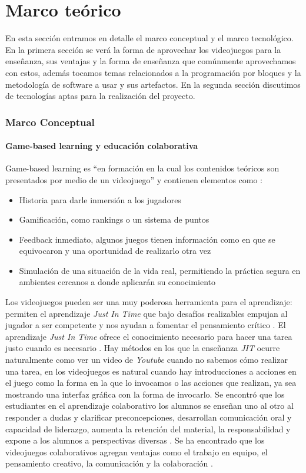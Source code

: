 \chapter{Marco teórico}
En esta sección entramos en detalle el marco conceptual y el marco tecnológico. En la primera sección se verá la forma de aprovechar los videojuegos para la enseñanza, sus ventajas y la forma de enseñanza que comúnmente aprovechamos con estos, además tocamos temas relacionados a la programación por bloques y la metodología de software a usar y sus artefactos. En la segunda sección discutimos de tecnologías aptas para la realización del proyecto.

\subsection{Marco Conceptual}
\subsubsection{Game-based learning y educación colaborativa}
Game-based learning es “en formación en la cual los contenidos teóricos son presentados por medio de un videojuego” \cite{gamelearn2014a} y contienen elementos como \cite{gamelearn2017a}:
\begin{itemize}
    \item Historia para darle inmersión a los jugadores
    \item Gamificación, como rankings o un sistema de puntos
    \item Feedback inmediato, algunos juegos tienen información como en que se equivocaron y una oportunidad de realizarlo otra vez
    \item Simulación de una situación de la vida real, permitiendo la práctica segura en ambientes cercanos a donde aplicarán su conocimiento
\end{itemize}

Los videojuegos pueden ser una muy poderosa herramienta para el aprendizaje: permiten el aprendizaje \textit{Just In Time} que bajo desafíos realizables empujan al 
jugador a ser competente y nos ayudan a fomentar el pensamiento crítico \cite{levasseur-a}. 
El aprendizaje \textit{Just In Time} ofrece el conocimiento necesario para hacer una tarea justo cuando es necesario \cite{unknown2017a}. 
Hay métodos en los que la enseñanza \textit{JIT} ocurre naturalmente como ver un video de \textit{Youtube} cuando no sabemos cómo realizar una tarea, 
en los videojuegos es natural cuando hay introducciones a acciones en el juego como la forma en la que lo invocamos o las acciones que realizan, 
ya sea mostrando una interfaz gráfica con la forma de invocarlo.
Se encontró que los estudiantes en el aprendizaje colaborativo los alumnos se enseñan uno al otro al responder a dudas y 
clarificar preconcepciones, desarrollan comunicación oral y capacidad de liderazgo, aumenta la retención del material, 
la responsabilidad y expone a los alumnos a perspectivas diversas \cite{university-a}.
Se ha encontrado que los videojuegos colaborativos agregan ventajas como el trabajo en equipo, el pensamiento creativo, 
la comunicación y la colaboración \cite{romano-a}.

